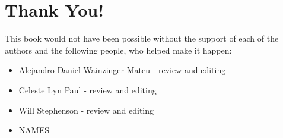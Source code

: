 \section*{Thank You!}

This book would not have been possible without the support of each of the
authors and the following people, who helped make it happen:
\begin{itemize}
 \item Alejandro Daniel Wainzinger Mateu - review and editing
 \item Celeste Lyn Paul - review and editing
 \item Will Stephenson - review and editing
 \item NAMES
\end{itemize}

\newpage
